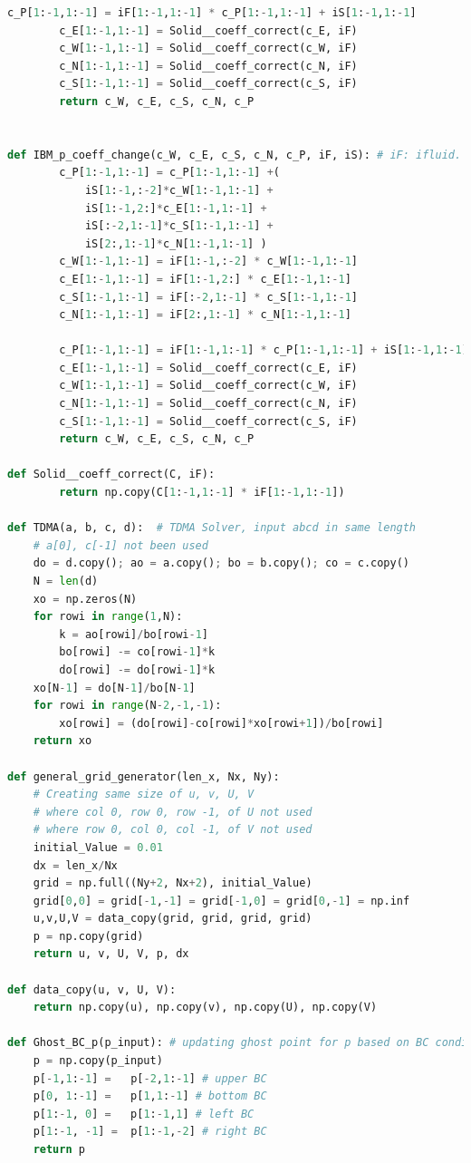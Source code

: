 \documentclass[12pt]{article}
\begin{document}
\begin{scriptsize}
\begin{lstlisting}[language=python,caption={N-S Cylinder Solver}]
        c_P[1:-1,1:-1] = iF[1:-1,1:-1] * c_P[1:-1,1:-1] + iS[1:-1,1:-1]
        c_E[1:-1,1:-1] = Solid__coeff_correct(c_E, iF)
        c_W[1:-1,1:-1] = Solid__coeff_correct(c_W, iF)
        c_N[1:-1,1:-1] = Solid__coeff_correct(c_N, iF)
        c_S[1:-1,1:-1] = Solid__coeff_correct(c_S, iF)
        return c_W, c_E, c_S, c_N, c_P
 

def IBM_p_coeff_change(c_W, c_E, c_S, c_N, c_P, iF, iS): # iF: ifluid. iS: isolid
        c_P[1:-1,1:-1] = c_P[1:-1,1:-1] +(
            iS[1:-1,:-2]*c_W[1:-1,1:-1] +
            iS[1:-1,2:]*c_E[1:-1,1:-1] +
            iS[:-2,1:-1]*c_S[1:-1,1:-1] +
            iS[2:,1:-1]*c_N[1:-1,1:-1] ) 
        c_W[1:-1,1:-1] = iF[1:-1,:-2] * c_W[1:-1,1:-1]
        c_E[1:-1,1:-1] = iF[1:-1,2:] * c_E[1:-1,1:-1]
        c_S[1:-1,1:-1] = iF[:-2,1:-1] * c_S[1:-1,1:-1]
        c_N[1:-1,1:-1] = iF[2:,1:-1] * c_N[1:-1,1:-1]
        
        c_P[1:-1,1:-1] = iF[1:-1,1:-1] * c_P[1:-1,1:-1] + iS[1:-1,1:-1]
        c_E[1:-1,1:-1] = Solid__coeff_correct(c_E, iF)
        c_W[1:-1,1:-1] = Solid__coeff_correct(c_W, iF)
        c_N[1:-1,1:-1] = Solid__coeff_correct(c_N, iF)
        c_S[1:-1,1:-1] = Solid__coeff_correct(c_S, iF)
        return c_W, c_E, c_S, c_N, c_P

def Solid__coeff_correct(C, iF):
        return np.copy(C[1:-1,1:-1] * iF[1:-1,1:-1])

def TDMA(a, b, c, d):  # TDMA Solver, input abcd in same length
    # a[0], c[-1] not been used
    do = d.copy(); ao = a.copy(); bo = b.copy(); co = c.copy()
    N = len(d)
    xo = np.zeros(N)
    for rowi in range(1,N):
        k = ao[rowi]/bo[rowi-1]
        bo[rowi] -= co[rowi-1]*k
        do[rowi] -= do[rowi-1]*k
    xo[N-1] = do[N-1]/bo[N-1]
    for rowi in range(N-2,-1,-1):
        xo[rowi] = (do[rowi]-co[rowi]*xo[rowi+1])/bo[rowi]
    return xo

def general_grid_generator(len_x, Nx, Ny):
    # Creating same size of u, v, U, V
    # where col 0, row 0, row -1, of U not used
    # where row 0, col 0, col -1, of V not used
    initial_Value = 0.01
    dx = len_x/Nx
    grid = np.full((Ny+2, Nx+2), initial_Value)
    grid[0,0] = grid[-1,-1] = grid[-1,0] = grid[0,-1] = np.inf
    u,v,U,V = data_copy(grid, grid, grid, grid)
    p = np.copy(grid)
    return u, v, U, V, p, dx

def data_copy(u, v, U, V):
    return np.copy(u), np.copy(v), np.copy(U), np.copy(V)

def Ghost_BC_p(p_input): # updating ghost point for p based on BC condition
    p = np.copy(p_input)
    p[-1,1:-1] =   p[-2,1:-1] # upper BC
    p[0, 1:-1] =   p[1,1:-1] # bottom BC
    p[1:-1, 0] =   p[1:-1,1] # left BC
    p[1:-1, -1] =  p[1:-1,-2] # right BC
    return p


\end{lstlisting}
\end{scriptsize}
\end{document}

